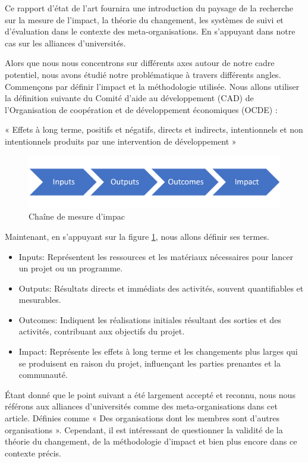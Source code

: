 Ce rapport d'état de l'art fournira une introduction du paysage de la recherche sur la mesure de l'impact, la théorie du changement, les systèmes de suivi et d'évaluation dans le contexte des meta-organisations. En s'appuyant dans notre cas sur les alliances d'universités. 

Alors que nous nous concentrons sur différents axes autour de notre cadre potentiel, nous avons étudié notre problématique à travers différents angles. 
Commençons par définir l'impact et la méthodologie utilisée. Nous allons utiliser la définition suivante du Comité d'aide au développement (CAD) de l'Organisation de coopération et de développement économiques (OCDE) :

« Effets à long terme, positifs et négatifs, directs et indirects, intentionnels et non intentionnels produits par une intervention de développement »\cite{oecd_quality_2010}

\begin{figure}
    \centering
    \includegraphics[width=1\linewidth]{Modele_Latex_CNRIUT2025//images/impact-chain.png}
    \caption{Chaîne de mesure d’impac\cite{stein_understanding_2012}}
    \label{fig:impact-chain}
\end{figure}
Maintenant, en s'appuyant sur la figure \ref{fig:impact-chain}, nous allons définir ses termes.
\begin{itemize}
    \item Inputs: Représentent les ressources et les matériaux nécessaires pour lancer un projet ou un programme.
    \item Outputs: Résultats directs et immédiats des activités, souvent quantifiables et mesurables.
    \item Outcomes: Indiquent les réalisations initiales résultant des sorties et des activités, contribuant aux objectifs du projet.
    \item Impact: Représente les effets à long terme et les changements plus larges qui se produisent en raison du projet, influençant les parties prenantes et la communauté.
\end{itemize}

Étant donné que le point suivant a été largement accepté et reconnu, nous nous référons aux alliances d'universités comme des meta-organisations dans cet article. Définies comme « Des organisations dont les membres sont d'autres organisations »\cite{ahrne_organizations_2005}. Cependant, il est intéressant de questionner la validité de la théorie du changement, de la méthodologie d'impact et bien plus encore dans ce contexte précis.

